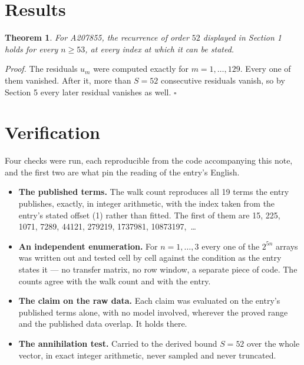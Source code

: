 \documentclass[11pt]{article}
\newtheorem{theorem}{Theorem}
\theoremstyle{definition}
\begin{document}
\section{Results}

\begin{theorem} For A207855, the recurrence of order $52$ displayed in Section 1 holds for every $n \ge 53$, at every index at which it can be stated.\end{theorem}

{\itshape Proof.} The residuals $u_m$ were computed exactly for $m = 1,\dots,129$. Every one of them vanished. After it, more than $S = 52$ consecutive residuals vanish, so by Section 5 every later residual vanishes as well. $\square$

\section{Verification}

Four checks were run, each reproducible from the code accompanying this note, and the first two are what pin the reading of the entry's English.

\begin{itemize}

\item {\bfseries The published terms.} The walk count reproduces all 19 terms the entry publishes, exactly, in integer arithmetic, with the index taken from the entry's stated offset (1) rather than fitted. The first of them are 15, 225, 1071, 7289, 44121, 279219, 1737981, 10873197,~\dots

\item {\bfseries An independent enumeration.} For $n = 1,\dots,3$ every one of the $2^{5n}$ arrays was written out and tested cell by cell against the condition as the entry states it --- no transfer matrix, no row window, a separate piece of code. The counts agree with the walk count and with the entry.

\item {\bfseries The claim on the raw data.} Each claim was evaluated on the entry's published terms alone, with no model involved, wherever the proved range and the published data overlap. It holds there.

\item {\bfseries The annihilation test.} Carried to the derived bound $S = 52$ over the whole vector, in exact integer arithmetic, never sampled and never truncated.

\end{itemize}
\end{document}
